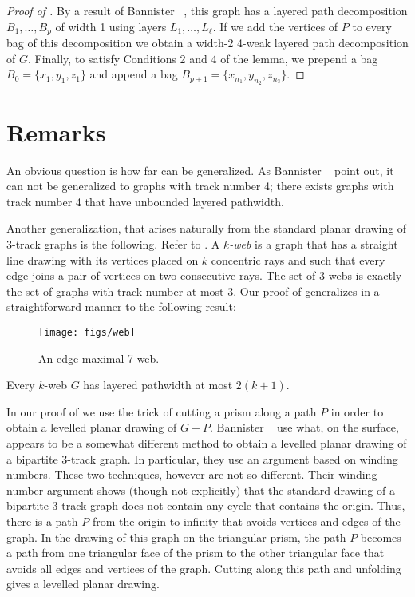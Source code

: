\documentclass{patmorin}
\begin{document}
\begin{proof}[Proof of ]
  By a result of Bannister \etal\ \cite[Proof of
  Theorem~5]{bannister.devanny.ea:track}, this graph has a layered
  path decomposition $B_1,\ldots,B_p$ of width 1 using layers
  $L_1,\ldots,L_\ell$.  If we add the vertices of $P$ to every bag
  of this decomposition we obtain a width-2 4-weak layered path
  decomposition of $G$.  Finally, to satisfy Conditions 2 and 4 of
  the lemma, we prepend a bag $B_0=\{x_1,y_1,z_1\}$ and append a bag
  $B_{p+1}=\{x_{n_1},y_{n_2},z_{n_3}\}$.
\end{proof}

\section{Remarks}

An obvious question is how far  can be generalized. As
Bannister \etal\ \cite{bannister.devanny.ea:track} point out, it can not be generalized to graphs with
track number 4; there exists graphs with track number 4 that have 
unbounded layered pathwidth.

Another generalization, that arises naturally from the standard planar
drawing of 3-track graphs is the following. Refer to .  
A \emph{$k$-web} is a
graph that has a straight line drawing with its vertices placed on $k$
concentric rays and such that every edge joins a pair of vertices on
two consecutive rays.  The set of 3-webs is exactly the set of graphs
with track-number at most 3.  Our proof of  generalizes in
a straightforward manner to the following result:

\begin{figure}
  \begin{center}
    \texttt{[image: figs/web]}
  \end{center}
  \caption{An edge-maximal 7-web.}
\end{figure}

\begin{thm}
   Every $k$-web $G$ has layered pathwidth at most $2(k+1)$.
\end{thm}

In our proof of  we use the trick of cutting a prism along
a path $P$ in order to obtain a levelled planar drawing of $G-P$.
Bannister \etal\ \cite{bannister.devanny.ea:track} use what, on the
surface, appears to be a somewhat different method to obtain a levelled
planar drawing of a bipartite 3-track graph.  In particular, they use
an argument based on winding numbers.  These two techniques, however
are not so different. Their winding-number argument shows (though not
explicitly) that the standard drawing of a bipartite 3-track graph
does not contain any cycle that contains the origin.  Thus, there is
a path $P$ from the origin to infinity that avoids vertices and edges
of the graph.  In the drawing of this graph on the triangular prism,
the path $P$ becomes a path from one triangular face of the prism to the
other triangular face that avoids all edges and vertices of the graph.
Cutting along this path and unfolding gives a levelled planar drawing.




\end{document}

